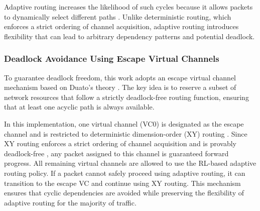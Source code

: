 Adaptive routing increases the likelihood of such cycles because it allows packets to dynamically select different paths \cite{LARE2023}. Unlike deterministic routing, which enforces a strict ordering of channel acquisition, adaptive routing introduces flexibility that can lead to arbitrary dependency patterns and potential deadlock.

\subsubsection{Deadlock Avoidance Using Escape Virtual Channels}

To guarantee deadlock freedom, this work adopts an escape virtual channel mechanism based on Duato's theory \cite{Duato1993}. The key idea is to reserve a subset of network resources that follow a strictly deadlock-free routing function, ensuring that at least one acyclic path is always available.

In this implementation, one virtual channel (VC0) is designated as the escape channel and is restricted to deterministic dimension-order (XY) routing \cite{Duato1993}. Since XY routing enforces a strict ordering of channel acquisition and is provably deadlock-free \cite{Dally1987}, any packet assigned to this channel is guaranteed forward progress. All remaining virtual channels are allowed to use the RL-based adaptive routing policy. If a packet cannot safely proceed using adaptive routing, it can transition to the escape VC and continue using XY routing. This mechanism ensures that cyclic dependencies are avoided while preserving the flexibility of adaptive routing for the majority of traffic.



